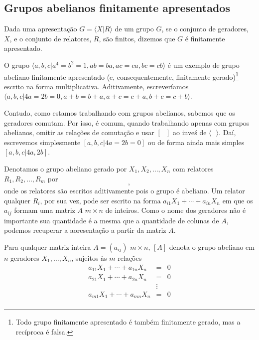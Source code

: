 	\subsection{Grupos abelianos finitamente apresentados}
	\begin{deff}
		\label{def grupo finitamente apresentado}
		Dada uma apresentação $G = \langle X|R \rangle$ de um grupo $G$, se o conjunto de geradores, $X$, e o conjunto de relatores, $R$, são finitos, dizemos que $G$ é finitamente apresentado.
	\end{deff}
	\par\vspace{0.3cm} O grupo $\langle a,b,c|a^4=b^2=1, ab=ba, ac=ca,bc=cb \rangle $ é um exemplo de grupo abeliano finitamente apresentado (e, consequentemente, finitamente gerado)\footnote{Todo grupo finitamente apresentado é também finitamente gerado, mas a recíproca é falsa.} escrito na forma multiplicativa. Aditivamente, escreveríamos $\langle a,b,c|4a=2b=0, a+b=b+a, a+c=c+a, b+c=c+b \rangle$. 
	\par\vspace{0.3cm} Contudo, como estamos trabalhando com grupos abelianos, sabemos que os geradores comutam. Por isso, é comum, quando trabalhando apenas com grupos abelianos, omitir as relações de comutação e usar $[ \text{ } ]$ ao inveś de $\langle \text{ } \rangle$. Daí, escrevemos simplesmente $[a,b,c\vert 4a=2b=0]$ ou de forma ainda mais simples $[a,b,c|4a,2b]$.
	\par\vspace{0.3cm} Denotamos o grupo abeliano gerado por $X_1, X_2, \dots, X_n$ com relatores $R_1, R_2, \dots, R_m$ por 
	\begin{equation*}
	[X_1, X_2, \dots, X_n\vert R_1, R_2, \dots, R_m],
	\end{equation*}
	onde os relatores são escritos aditivamente pois o grupo é abeliano. Um relator qualquer $R_i$, por sua vez, pode ser escrito na forma $a_{i1}X_1+ \cdots +a_{in}X_n$ em que os $a_{ij}$ formam uma matriz $A$ $m\times n$ de inteiros. Como o nome dos geradores não é importante sua quantidade é a mesma que a quantidade de colunas de $A$, podemos recuperar a aoresentação a partir da matriz $A$.
	\par\vspace{0.3cm} Para qualquer matriz inteira $A=(a_{ij})$ $m\times n$, $[A]$ denota o grupo abeliano em $n$ geradores $X_1, \dots, X_n$, sujeitos às $m$ relações
	\begin{equation*}
	\begin{array}{ccc}
	a_{11}X_1 +  \cdots  + a_{1n}X_n & = & 0 \\
	a_{21}X_1 +  \cdots  + a_{2n}X_n & = & 0 \\
	& \vdots &  \\
	a_{m1}X_1 +  \cdots  + a_{mn}X_n & = & 0 \\
	\end{array} 	
	\end{equation*}
